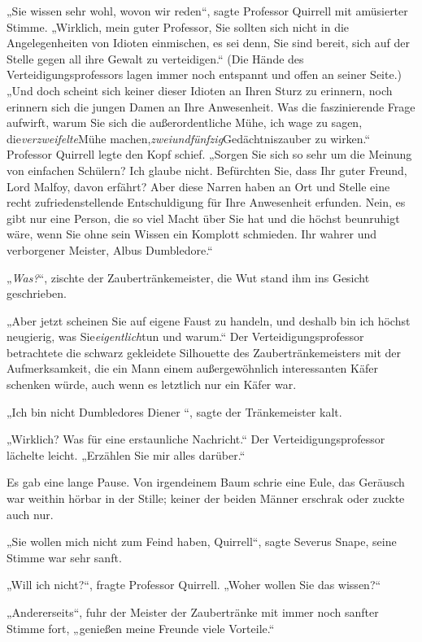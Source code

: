 {„Sie wissen sehr wohl, wovon wir reden“, sagte Professor Quirrell mit amüsierter Stimme. „Wirklich, mein guter Professor, Sie sollten sich nicht in die Angelegenheiten von Idioten einmischen, es sei denn, Sie sind bereit, sich auf der Stelle gegen all ihre Gewalt zu verteidigen.“ (Die Hände des Verteidigungsprofessors lagen immer noch entspannt und offen an seiner Seite.) „Und doch scheint sich keiner dieser Idioten an Ihren Sturz zu erinnern, noch erinnern sich die jungen Damen an Ihre Anwesenheit. Was die faszinierende Frage aufwirft, warum Sie sich die außerordentliche Mühe, ich wage zu sagen, die\emph{verzweifelte}Mühe machen,\emph{zweiundfünfzig}Gedächtniszauber zu wirken.“ Professor Quirrell legte den Kopf schief. „Sorgen Sie sich so sehr um die Meinung von einfachen Schülern? Ich glaube nicht. Befürchten Sie, dass Ihr guter Freund, Lord Malfoy, davon erfährt? Aber diese Narren haben an Ort und Stelle eine recht zufriedenstellende Entschuldigung für Ihre Anwesenheit erfunden. Nein, es gibt nur eine Person, die so viel Macht über Sie hat und die höchst beunruhigt wäre, wenn Sie ohne sein Wissen ein Komplott schmieden. Ihr wahrer und verborgener Meister, Albus Dumbledore.“

„\emph{Was?}“, zischte der Zaubertränkemeister, die Wut stand ihm ins Gesicht geschrieben.

„Aber jetzt scheinen Sie auf eigene Faust zu handeln, und deshalb bin ich höchst neugierig, was Sie\emph{eigentlich}tun und warum.“ Der Verteidigungsprofessor betrachtete die schwarz gekleidete Silhouette des Zaubertränkemeisters mit der Aufmerksamkeit, die ein Mann einem außergewöhnlich interessanten Käfer schenken würde, auch wenn es letztlich nur ein Käfer war.

„Ich bin nicht Dumbledores Diener “, sagte der Tränkemeister kalt.

„Wirklich? Was für eine erstaunliche Nachricht.“ Der Verteidigungsprofessor lächelte leicht. „Erzählen Sie mir alles darüber.“

Es gab eine lange Pause. Von irgendeinem Baum schrie eine Eule, das Geräusch war weithin hörbar in der Stille; keiner der beiden Männer erschrak oder zuckte auch nur.

„Sie wollen mich nicht zum Feind haben, Quirrell“, sagte Severus Snape, seine Stimme war sehr sanft.

„Will ich nicht?“, fragte Professor Quirrell. „Woher wollen Sie das wissen?“

„Andererseits“, fuhr der Meister der Zaubertränke mit immer noch sanfter Stimme fort, „genießen meine Freunde viele Vorteile.“

}
